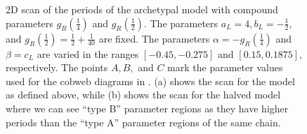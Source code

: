 \begin{figure}
	\centering
	\caption[2D scans of the periods of the archetypal model]{
		2D scan of the periods of the archetypal model with compound parameters $g_R\left(\frac{1}{4}\right)$ and $g_R\left(\frac{1}{2}\right)$.
		The parameters $a_L = 4, b_L = -\frac{1}{2},$ and $g_R\left(\frac{1}{2}\right) = \frac{1}{2} + \frac{1}{40}$ are fixed.
		The parameters $\alpha = -g_R\left(\frac{1}{4}\right)$ and $\beta = c_L$ are varied in the ranges $[-0.45, -0.275]$ and $[0.15, 0.1875]$, respectively.
		The points $A, B,$ and $C$ mark the parameter values used for the cobweb diagrams in .
		(a) shows the scan for the model as defined above, while (b) shows the scan for the halved model where we can see ``type B'' parameter regions as they have higher periods than the ``type A'' parameter regions of the same chain.
	}
	\label{fig:setup.arch.period}
\end{figure}

